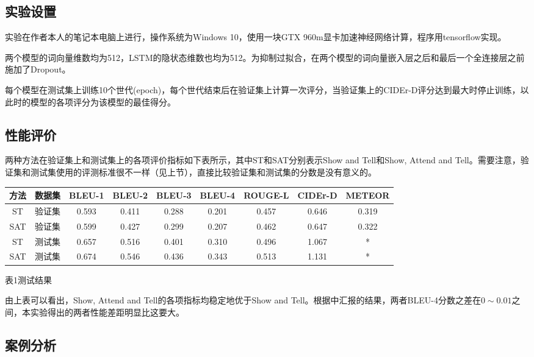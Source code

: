 \documentclass[10pt,a4paper,UTF8]{ctexart}
\begin{document}
\begin{spacing}{1.5}
		\subsection{实验设置}
		
		实验在作者本人的笔记本电脑上进行，操作系统为Windows 10，使用一块GTX 960m显卡加速神经网络计算，程序用tensorflow实现。
		
		两个模型的词向量维数均为512，LSTM的隐状态维数也均为512。为抑制过拟合，在两个模型的词向量嵌入层之后和最后一个全连接层之前施加了Dropout。
		
		每个模型在测试集上训练10个世代(epoch)，每个世代结束后在验证集上计算一次评分，当验证集上的CIDEr-D评分达到最大时停止训练，以此时的模型的各项评分为该模型的最佳得分。
		
		\subsection{性能评价}
		
		两种方法在验证集上和测试集上的各项评价指标如下表所示，其中ST和SAT分别表示Show and Tell和Show, Attend and Tell。需要注意，验证集和测试集使用的评测标准很不一样（见上节），直接比较验证集和测试集的分数是没有意义的。
		
		\begin{center}
			\begin{tabular}[h]{|c|c|c|c|c|c|c|c|c|}
				\hline
				\textbf{方法} & \textbf{数据集} & \textbf{BLEU-1} & \textbf{BLEU-2}  & \textbf{BLEU-3} & \textbf{BLEU-4} & \textbf{ROUGE-L} & \textbf{CIDEr-D} & \textbf{METEOR}\\
				\hline
				ST & 验证集 & 0.593 & 0.411 & 0.288 & 0.201 & 0.457 & 0.646 & 0.319 \\
				\hline
				SAT & 验证集 & 0.599 & 0.427 & 0.299 & 0.207 & 0.462 & 0.647 & 0.322 \\
				\hline
				ST & 测试集 & 0.657 & 0.516 & 0.401 & 0.310 & 0.496 & 1.067 & * \\
				\hline
				SAT & 测试集 & 0.674 & 0.546 & 0.436 & 0.343 & 0.513 & 1.131 & * \\
				\hline
			\end{tabular}\par\bigskip
			表1\space 测试结果
		\end{center}
		
		由上表可以看出，Show, Attend and Tell的各项指标均稳定地优于Show and Tell。根据\cite{sat}中汇报的结果，两者BLEU-4分数之差在$0\sim0.01$之间，本实验得出的两者性能差距明显比这要大。
		
		\subsection{案例分析}
		

\end{spacing}
\end{document}
